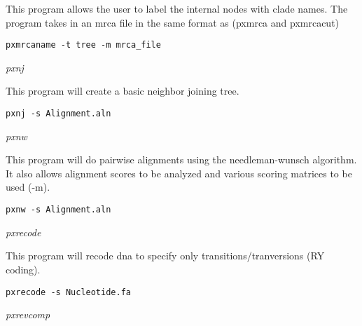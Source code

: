 \documentclass[12pt,letterpaper]{article}
\renewcommand{\subsection}[1]{%
\bigskip
\begin{center}
\begin{large}
\normalfont\itshape #1
\end{large}
\end{center}}
\begin{document}
This program allows the user to label the internal nodes with clade names. The program takes in an mrca file in the same format as (pxmrca and pxmrcacut)

\begin{flushleft}
\begin{verbatim}
pxmrcaname -t tree -m mrca_file
\end{verbatim}
\end{flushleft}

\subsection{pxnj}

This program will create a basic neighbor joining tree.

\begin{flushleft}
\begin{verbatim}
pxnj -s Alignment.aln
\end{verbatim}
\end{flushleft}

\subsection{pxnw}

This program will do pairwise alignments using the needleman-wunsch algorithm. It also allows alignment scores to be analyzed and various scoring matrices to be used (-m).

\begin{flushleft}
\begin{verbatim}
pxnw -s Alignment.aln
\end{verbatim}
\end{flushleft}

\subsection{pxrecode}

This program will recode dna to specify only transitions/tranversions (RY coding).

\begin{flushleft}
\begin{verbatim}
pxrecode -s Nucleotide.fa
\end{verbatim}
\end{flushleft}

\subsection{pxrevcomp}
\end{document}
